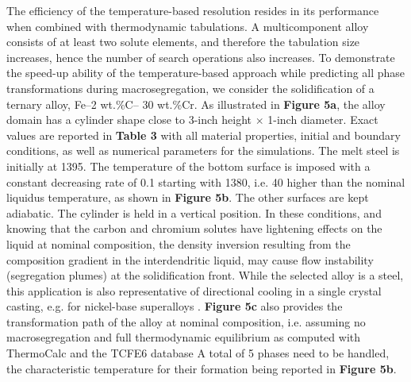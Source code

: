 The efficiency of the temperature-based resolution resides in its performance when combined with 
thermodynamic tabulations. A multicomponent alloy consists of at least two solute elements, and 
therefore the tabulation size increases, hence the number of search operations also increases. 
To demonstrate the speed-up ability of the temperature-based approach while predicting all phase 
transformations during macrosegregation, we consider the solidification of a ternary alloy, Fe–2 wt.\%C– 30 wt.\%Cr. 
As illustrated in \textbf{Figure 5a}, the alloy domain has a cylinder shape close to 3-inch height $\times$ 1-inch diameter. 
Exact values are reported in \textbf{Table 3} with all material properties, initial and boundary conditions, 
as well as numerical parameters for the simulations. The melt steel is initially at \SI{1395}{\udegC}. The 
temperature of the bottom surface is imposed with a constant decreasing rate of \SI{0.1}{\uCR} starting 
with \SI{1380}{\udegC}, i.e. \SI{40}{\udegC} higher than the nominal liquidus temperature, as shown 
in \textbf{Figure 5b}. The other surfaces are kept adiabatic. The cylinder is held in a vertical position. 
In these conditions, and knowing that the carbon and chromium solutes have lightening effects on the liquid 
at nominal composition, the density inversion resulting from the composition gradient in the interdendritic 
liquid, may cause flow instability (segregation plumes) at the solidification front. While the selected alloy 
is a steel, this application is also representative of directional cooling in a single crystal casting, e.g. 
for nickel-base superalloys \citep{beckermann_development_2000}. \textbf{Figure 5c} also provides the 
transformation path of the alloy at nominal composition, i.e. assuming no macrosegregation and full 
thermodynamic equilibrium as computed with ThermoCalc and the TCFE6 database %
A total of 5 phases need to be handled, the characteristic temperature for their formation being reported 
in \textbf{Figure 5b}. %
 
